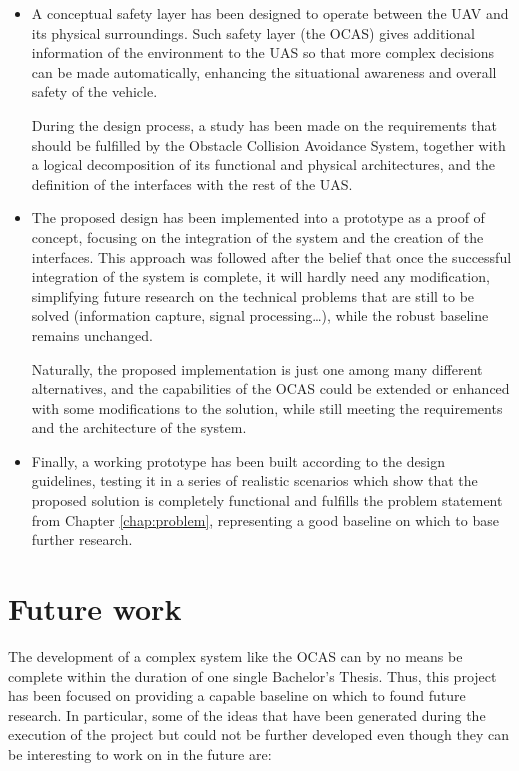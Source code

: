 \begin{itemize}

	\item A conceptual safety layer has been designed to operate between the UAV and its physical surroundings.
		Such safety layer (the OCAS) gives additional information of the environment to the UAS so that more complex decisions can be made automatically, enhancing the situational awareness and overall safety of the vehicle.

		During the design process, a study has been made on the requirements that should be fulfilled by the Obstacle Collision Avoidance System, together with a logical decomposition of its functional and physical architectures, and the definition of the interfaces with the rest of the UAS.

	\item The proposed design has been implemented into a prototype as a proof of concept, focusing on the integration of the system and the creation of the interfaces.
		This approach was followed after the belief that once the successful integration of the system is complete, it will hardly need any modification, simplifying future research on the technical problems that are still to be solved (information capture, signal processing\ldots), while the robust baseline remains unchanged.

		Naturally, the proposed implementation is just one among many different alternatives, and the capabilities of the OCAS could be extended or enhanced with some modifications to the solution, while still meeting the requirements and the architecture of the system.

	\item Finally, a working prototype has been built according to the design guidelines, testing it in a series of realistic scenarios which show that the proposed solution is completely functional and fulfills the problem statement from Chapter \ref{chap:problem}, representing a good baseline on which to base further research.

\end{itemize}

\section{Future work}

The development of a complex system like the OCAS can by no means be complete within the duration of one single Bachelor's Thesis.
Thus, this project has been focused on providing a capable baseline on which to found future research.
In particular, some of the ideas that have been generated during the execution of the project but could not be further developed even though they can be interesting to work on in the future are:

